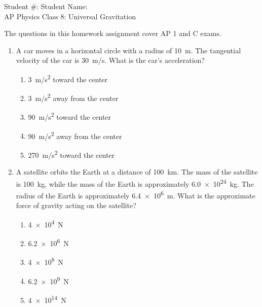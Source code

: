 \documentclass[12pt]{article}
\begin{document}
\begin{center}
  Student \#: \underline{\hspace{1in}}\hspace{1.9in}
  Student Name: \underline{\hspace{2in}}\\
  \vspace{0.3in}
  {\LARGE AP Physics \hspace{0.68in} Class 8: Universal Gravitation}
\end{center}

\noindent The questions in this homework assignment cover AP 1 and C exams.

\begin{enumerate}[leftmargin=50pt,label=\underline{\hspace{0.4in}} \arabic*.]

\item A car moves in a horizontal circle with a radius of \SI{10}{m}. The
  tangential velocity of the car is \SI{30}{m/s}. What is the car's
  acceleration?
  \begin{enumerate}[noitemsep,topsep=0pt,leftmargin=18pt]
  \item\SI{3  }{m/s^2} toward the center
  \item\SI{3  }{m/s^2} away from the center
  \item\SI{90 }{m/s^2} toward the center
  \item\SI{90 }{m/s^2} away from the center
  \item\SI{270}{m/s^2} toward the center
  \end{enumerate}
  
\item A satellite orbits the Earth at a distance of \SI{100}{km}. The mass of
  the satellite is \SI{100}{kg}, while the mass of the Earth is approximately
  \SI{6.0e24}{kg}. The radius of the Earth is approximately \SI{6.4e6}{m}. What
  is the approximate force of gravity acting on the satellite?
  \begin{enumerate}[noitemsep,topsep=0pt,leftmargin=18pt]
  \item\SI{4e4}{N}
  \item\SI{6.2e6}{N}
  \item\SI{4e8}{N}
  \item\SI{6.2e9}{N}
  \item\SI{4e14}{N}
  \end{enumerate}


\end{enumerate}
\end{document}

